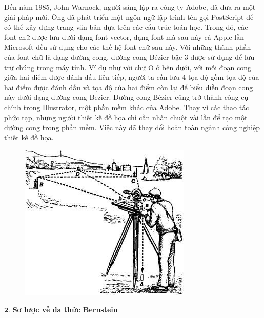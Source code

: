 \begin{multicols}{2}
	\vskip 0.1cm
	Đến năm $1985$, John Warnock, người sáng lập ra công ty Adobe, đã đưa ra một giải pháp mới. Ông đã phát triển một ngôn ngữ lập trình tên gọi PostScript để có thể xây dựng trang văn bản dựa trên các cấu trúc toán học. Trong đó, các font chữ được lưu dưới dạng font vector, dạng font mà sau này cả Apple lẫn Microsoft đều sử dụng cho các thế hệ font chữ sau này. Với những thành phần của font chữ là dạng đường cong, đường cong Bézier bậc $3$ được sử dụng để lưu trữ chúng trong máy tính. Ví dụ như với chữ O ở bên dưới, với mỗi đoạn cong giữa hai điểm được đánh dấu liên tiếp, người ta cần lưu $4$ tọa độ gồm tọa độ của hai điểm được đánh dấu và tọa độ của hai điểm còn lại để biểu diễn đoạn cong này dưới dạng đường cong Bezier.
	\vskip 0.1cm
	Đường cong Bézier cũng trở thành công cụ chính trong Illustrator, một phần mềm khác của Adobe. Thay vì các thao tác phức tạp, những người thiết kế đồ họa chỉ cần nhấn chuột vài lần để tạo một đường cong trong phần mềm. Việc này đã thay đổi hoàn toàn ngành công nghiệp thiết kế đồ họa.
	\begin{figure}[H]
		\vspace*{-5pt}
		\centering
		\captionsetup{labelformat= empty, justification=centering}
		\includegraphics[width= 1\linewidth]{6}
		\vspace*{-15pt}
	\end{figure}
	$\pmb2.$ \textbf{\color{toanhocdoisong}Sơ lược về đa thức Bernstein}

\end{multicols}
